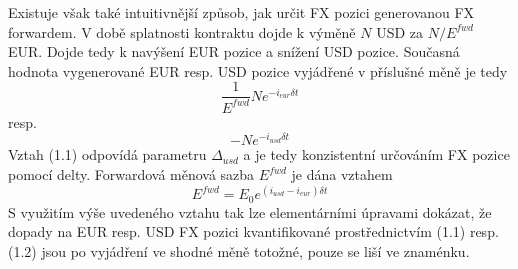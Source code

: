 \documentclass[a4paper]{book}
\begin{document}
Existuje však také intuitivnější způsob, jak určit FX pozici generovanou FX forwardem. V době splatnosti kontraktu dojde k výměně $N$ USD za $N/E^{fwd}$ EUR. Dojde tedy k navýšení EUR pozice a snížení USD pozice. Současná hodnota vygenerované EUR resp. USD pozice vyjádřené v příslušné měně je tedy
\begin{equation}
\frac{1}{E^{fwd}} N e^{-i_{eur} \delta t}
\end{equation}
resp.
\begin{equation}
- N e^{-i_{usd} \delta t}
\end{equation}
Vztah (1.1) odpovídá parametru $\Delta_{usd}$ a je tedy konzistentní určováním FX pozice pomocí delty. Forwardová měnová sazba $E^{fwd}$ je dána vztahem
\begin{equation*}
E^{fwd} = E_0 e^{(i_{usd} - i_{eur}) \delta t}
\end{equation*}
S využitím výše uvedeného vztahu tak lze elementárními úpravami dokázat, že dopady na EUR resp. USD FX pozici kvantifikované prostřednictvím (1.1) resp. (1.2) jsou po vyjádření ve shodné měně totožné, pouze se liší ve znaménku.
\end{document}
